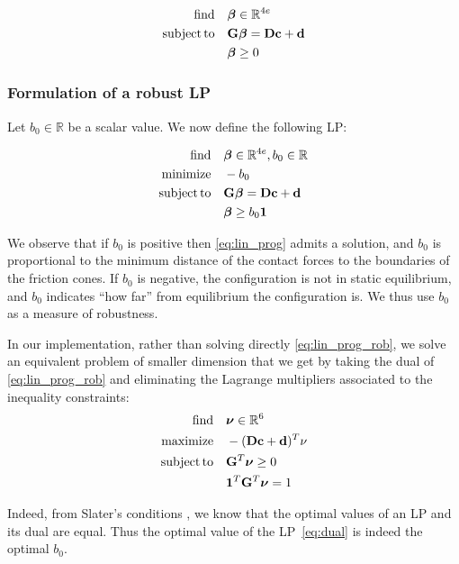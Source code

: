 \begin{equation} \label{eq:lin_prog} \begin{aligned}
\find \quad & \bm{\beta} \in \Rv{4e} \\
\st \quad &\mathbf{G} \bm{\beta} = \mathbf{D} \mathbf{c} + \mathbf{d} \\
& \bm{\beta} \ge 0 \\
\end{aligned} \end{equation}

\subsubsection{Formulation of a robust LP}
Let $b_0 \in \mathbb{R}$ be a scalar value. We now define the following LP:

\begin{equation} \label{eq:lin_prog_rob} \begin{aligned}
\find \quad & \bm{\beta} \in \Rv{4e}, b_0 \in \Rv{} \\
\minimize  \quad & -b_0 \\
\st \quad &\mathbf{G} \bm{\beta} = \mathbf{D} \mathbf{c} + \mathbf{d} \\
& \bm{\beta} \ge b_0 \bm{1}\\
\end{aligned} \end{equation}

We observe that if $b_0$ is positive then \eqref{eq:lin_prog} admits a solution, and $b_0$ is proportional to the minimum distance of the contact forces to the boundaries of the friction cones.
If $b_0$ is negative, the configuration is not in static equilibrium, and $b_0$ indicates ``how far'' from equilibrium the configuration is. We thus use $b_0$ as a measure of robustness.

In our implementation, rather than solving directly \eqref{eq:lin_prog_rob}, we solve an equivalent problem of smaller dimension that we get by taking the dual of \eqref{eq:lin_prog_rob} and eliminating the Lagrange multipliers associated to the inequality constraints:
\begin{equation} \label{eq:dual} \begin{aligned}
\find \quad & \bm{\nu} \in \Rv{6}\\
\maximize  \quad & -(\mathbf{D} \mathbf{c} + \mathbf{d})^T \nu \\
\st \quad &\mathbf{G}^T \bm{\nu} \ge 0 \\
& \mathbf{1}^T \mathbf{G}^T \bm{\nu} = 1 \\
\end{aligned} \end{equation}

Indeed, from Slater's conditions \citep{Boyd:2004:CO:993483}, we know that the optimal values of an LP and its dual are equal. Thus the optimal value of the LP~\eqref{eq:dual} is indeed the optimal $b_0$.

